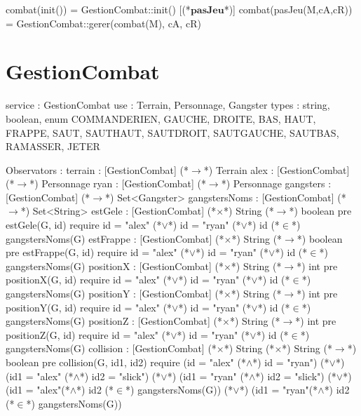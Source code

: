 \documentclass[a4paper, 11pt]{report}
\newcommand{\specB}[1]{\textbf{#1}}
\begin{document}
\begin{Spe}
      [(*$\specB{init}$*)]
          combat(init()) = GestionCombat::init()
      [(*$\specB{pasJeu}$*)]
          combat(pasJeu(M,cA,cR)) = GestionCombat::gerer(combat(M), cA, cR)
            
\end{Spe}

\section{GestionCombat}
\begin{Spe}
service : GestionCombat
use : Terrain, Personnage, Gangster  
types : string, boolean, enum COMMANDE{RIEN, GAUCHE, DROITE, BAS, HAUT, FRAPPE, SAUT, SAUTHAUT, SAUTDROIT, SAUTGAUCHE, SAUTBAS,  RAMASSER, JETER}

Observators :
      terrain : [GestionCombat] (*$\rightarrow$*) Terrain
      alex : [GestionCombat] (*$\rightarrow$*) Personnage
      ryan : [GestionCombat] (*$\rightarrow$*) Personnage
      gangsters :  [GestionCombat] (*$\rightarrow$*) Set<Gangster>
      gangstersNoms : [GestionCombat] (*$\rightarrow$*) Set<String>
      estGele : [GestionCombat] (*$\times$*) String (*$\rightarrow$*) boolean 
            pre estGele(G, id) require id = "alex" (*$\lor$*) id = "ryan"  (*$\lor$*) id (*$\in$*) gangstersNoms(G)
      estFrappe : [GestionCombat] (*$\times$*) String (*$\rightarrow$*) boolean 
            pre estFrappe(G, id) require id = "alex" (*$\lor$*) id = "ryan"  (*$\lor$*) id (*$\in$*) gangstersNoms(G)
      positionX : [GestionCombat] (*$\times$*) String (*$\rightarrow$*) int
            pre positionX(G, id) require id = "alex" (*$\lor$*) id = "ryan"  (*$\lor$*) id (*$\in$*) gangstersNoms(G)
      positionY : [GestionCombat] (*$\times$*) String (*$\rightarrow$*) int 
            pre positionY(G, id) require id = "alex" (*$\lor$*) id = "ryan"  (*$\lor$*) id (*$\in$*) gangstersNoms(G)
      positionZ : [GestionCombat] (*$\times$*) String (*$\rightarrow$*) int
            pre positionZ(G, id) require id = "alex" (*$\lor$*) id = "ryan"  (*$\lor$*) id (*$\in$*) gangstersNoms(G)
      collision : [GestionCombat] (*$\times$*) String (*$\times$*) String (*$\rightarrow$*) boolean
            pre collision(G, id1, id2) require 
            (id = "alex" (*$\land$*) id = "ryan")
            (*$\lor$*) (id1 = "alex" (*$\land$*) id2 = "slick") 
            (*$\lor$*) (id1 = "ryan" (*$\land$*) id2 = "slick")
            (*$\lor$*) (id1 = "alex"(*$\land$*) id2 (*$\in$*) gangstersNoms(G))
            (*$\lor$*) (id1 = "ryan"(*$\land$*) id2 (*$\in$*) gangstersNoms(G))


\end{Spe}
\end{document}
